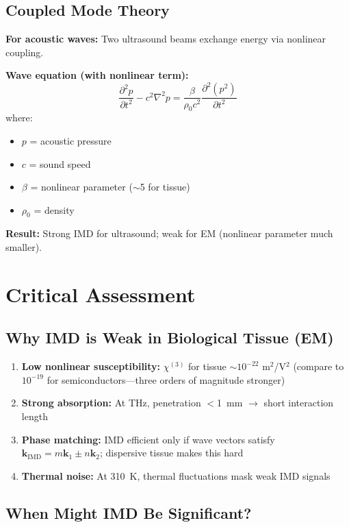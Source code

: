 \subsection{Coupled Mode Theory}

\textbf{For acoustic waves:} Two ultrasound beams exchange energy via nonlinear coupling.

\textbf{Wave equation (with nonlinear term):}
\begin{equation}
\label{eq:nonlinear-wave-equation}
\frac{\partial^2 p}{\partial t^2} - c^2 \nabla^2 p = \frac{\beta}{\rho_0 c^2} \frac{\partial^2 (p^2)}{\partial t^2}
\end{equation}
where:
\begin{itemize}
\item $p$ = acoustic pressure
\item $c$ = sound speed
\item $\beta$ = nonlinear parameter ($\sim$5 for tissue)
\item $\rho_0$ = density
\end{itemize}

\textbf{Result:} Strong IMD for ultrasound; weak for EM (nonlinear parameter much smaller).

\section{Critical Assessment}

\subsection{Why IMD is Weak in Biological Tissue (EM)}

\begin{enumerate}
\item \textbf{Low nonlinear susceptibility:} $\chi^{(3)}$ for tissue $\sim 10^{-22}$ m$^2$/V$^2$ (compare to $10^{-19}$ for semiconductors---three orders of magnitude stronger)
\item \textbf{Strong absorption:} At THz, penetration $<$1~mm $\rightarrow$ short interaction length
\item \textbf{Phase matching:} IMD efficient only if wave vectors satisfy $\mathbf{k}_{\text{IMD}} = m\mathbf{k}_1 \pm n\mathbf{k}_2$; dispersive tissue makes this hard
\item \textbf{Thermal noise:} At 310~K, thermal fluctuations mask weak IMD signals
\end{enumerate}

\subsection{When Might IMD Be Significant?}

